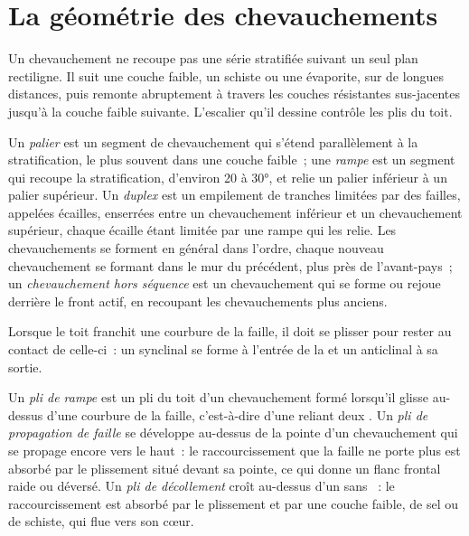 \section{La géométrie des chevauchements}\label{sec:b3:orogenic-wedges:geometry}

Un chevauchement ne recoupe pas une série stratifiée suivant un seul plan rectiligne.
Il suit une couche faible, un schiste ou une évaporite, sur de longues distances, puis
remonte abruptement à travers les couches résistantes sus-jacentes jusqu'à la couche faible suivante.
L'escalier qu'il dessine contrôle les plis du toit.

\begin{definition}\label{def:b3:orogenic-wedges:thrust-geometry}
Un \emph{palier} est un segment de chevauchement qui s'étend
parallèlement à la stratification, le plus souvent dans une couche faible~; une \emph{rampe}
est un segment qui recoupe la stratification,
d'environ 20 à \ang{30}, et relie un palier inférieur à un palier supérieur. Un
\emph{duplex} est un empilement de tranches limitées par des failles,
appelées écailles, enserrées entre un chevauchement inférieur et un chevauchement
supérieur, chaque écaille étant limitée par une rampe qui les relie. Les chevauchements
se forment en général dans l'ordre, chaque nouveau chevauchement se formant dans le mur du précédent, plus près de
l'avant-pays~; un \emph{chevauchement hors séquence} est
un chevauchement qui se forme ou rejoue derrière le front actif, en recoupant les chevauchements plus anciens.
\end{definition}

Lorsque le toit franchit une courbure de la faille, il doit se plisser pour rester au
contact de celle-ci~: un synclinal se forme à l'entrée de la  et un anticlinal
à sa sortie.

\begin{definition}\label{def:b3:orogenic-wedges:thrust-folds}
Un \emph{pli de rampe} est un pli du toit d'un chevauchement
formé lorsqu'il glisse au-dessus d'une courbure de la faille, c'est-à-dire d'une  reliant
deux . Un \emph{pli de propagation de faille}
se développe au-dessus de la pointe d'un chevauchement qui se propage encore vers le haut~: le
raccourcissement que la faille ne porte plus est absorbé par le plissement situé devant
sa pointe, ce qui donne un flanc frontal raide ou déversé. Un \emph{pli de
décollement} croît au-dessus d'un  sans ~: le
raccourcissement est absorbé par le plissement et par une couche faible, de sel ou de schiste, qui
flue vers son cœur.
\end{definition}

